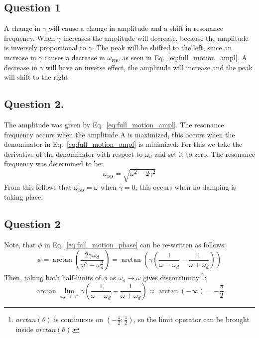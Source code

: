 \subsection{Question 1}

A change in $\gamma$ will cause a change in amplitude and a shift in resonance frequency. When $\gamma$ increases the amplitude will decrease, because the amplitude is inversely proportional to $\gamma$. The peak will be shifted to the left, since an increase in $\gamma$ causes a decrease in $\omega_{\text{res}}$, as seen in Eq.~\eqref{eq:full_motion_ampl}. A decrease in $\gamma$ will have an inverse effect, the amplitude will increase and the peak will shift to the right.

\subsection{Question 2.}
The amplitude was given by Eq.~\eqref{eq:full_motion_ampl}. The resonance frequency occurs when the amplitude A is maximized, this occurs when the denominator in Eq.~\eqref{eq:full_motion_ampl} is minimized. For this we take the derivative of the denominator with respect to $\omega_d$ and set it to zero. The resonance frequency was determined to be: 
\begin{equation} \label{eq:freq_deps}
        \omega_{\text{res}} = \sqrt{\omega^2 - 2\gamma^2}
\end{equation}
From this follows that $\omega_{\text{res}} = \omega$ when $\gamma = 0$, this occurs when no damping is taking place.

\subsection{Question 2}
Note, that $\phi$ in Eq.~\eqref{eq:full_motion_phase} can be re-written as follows:
\begin{equation*}
        \phi = \arctan(\frac{2\gamma\omega_d}{\omega^2 - \omega_d^2}) = \arctan(\gamma ( \frac{1}{\omega-\omega_d} - \frac{1}{\omega+\omega_d} ))
\end{equation*}
Then, taking both half-limits of $\phi$ as $\omega_d \rightarrow \omega$ gives discontinuity \footnote{$arctan(\theta)$ is continuous on $(-\frac{\pi}{2};\frac{\pi}{2})$, so the limit operator can be brought inside $arctan(\theta)$.}:
\begin{equation*}
        \arctan \lim_{\omega_d \rightarrow \omega^+} {\gamma ( \frac{1}{\omega-\omega_d} - \frac{1}{\omega+\omega_d} )} \asymp \arctan( -\infty) = -\frac{\pi}{2}
\end{equation*}

